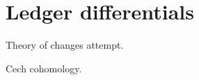 \section{Ledger differentials}
\label{sec:differentials}

Theory of changes \cite{changes} attempt.

Cech cohomology.
